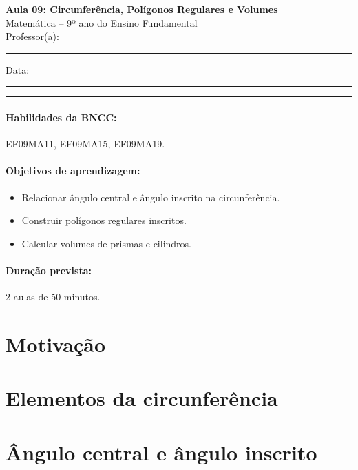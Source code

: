 \documentclass[11pt,a4paper]{article}
\newcommand{\numaula}{09}
\newcommand{\tituloaula}{Circunferência, Polígonos Regulares e Volumes}
\begin{document}
\begin{center}
  {\Large\bfseries Aula \numaula: \tituloaula}\\[4pt]
  {\large Matemática -- 9º ano do Ensino Fundamental}\\[2pt]
  Professor(a): \rule{6cm}{0.4pt} \qquad Data: \rule{3cm}{0.4pt}
\end{center}
\noindent\rule{\linewidth}{0.8pt}

\paragraph{Habilidades da BNCC:} EF09MA11, EF09MA15, EF09MA19.

\paragraph{Objetivos de aprendizagem:}
\begin{itemize}[nosep]
  \item Relacionar ângulo central e ângulo inscrito na circunferência.
  \item Construir polígonos regulares inscritos.
  \item Calcular volumes de prismas e cilindros.
\end{itemize}

\paragraph{Duração prevista:} 2 aulas de 50 minutos. %

\section{Motivação}

\section{Elementos da circunferência}

\section{Ângulo central e ângulo inscrito}
\end{document}

